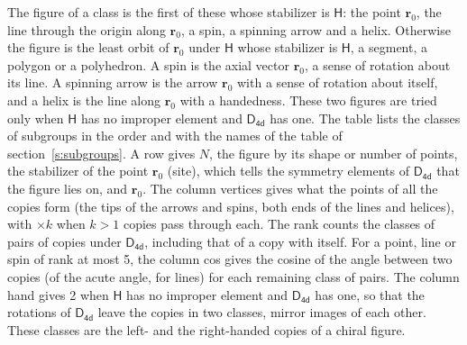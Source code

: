 \documentclass[10pt,a4paper]{article}
\numberwithin{equation}{section}
\newcommand{\grp}[1]{\mathsf{#1}}
\newcommand{\pointr}{\mathbf{r}}
\begin{document}
\leavevmode\label{n:head.figure}The figure of a class is the first of these whose stabilizer is $\grp{H}$: the point $\pointr_0$, the line through the origin along $\pointr_0$, a spin, a spinning arrow and a helix. Otherwise the figure is the least orbit of $\pointr_0$ under $\grp{H}$ whose stabilizer is $\grp{H}$, a segment, a polygon or a polyhedron. A spin is the axial vector $\pointr_0$, a sense of rotation about its line. A spinning arrow is the arrow $\pointr_0$ with a sense of rotation about itself, and a helix is the line along $\pointr_0$ with a handedness. These two figures are tried only when $\grp{H}$ has no improper element and $\grp{D_{4d}}$ has one. The table lists the classes of subgroups in the order and with the names of the table of section~\ref{s:subgroups}. \label{n:head.site}A row gives $N$, the figure by its shape or number of points, the stabilizer of the point $\pointr_0$ (site), which tells the symmetry elements of $\grp{D_{4d}}$ that the figure lies on, and $\pointr_0$. \label{n:head.vertices}The column vertices gives what the points of all the copies form (the tips of the arrows and spins, both ends of the lines and helices), with ${\times}k$ when $k > 1$ copies pass through each. \label{n:head.rank}The rank counts the classes of pairs of copies under $\grp{D_{4d}}$, including that of a copy with itself. \label{n:head.cos}For a point, line or spin of rank at most 5, the column cos gives the cosine of the angle between two copies (of the acute angle, for lines) for each remaining class of pairs. \label{n:head.hand}The column hand gives 2 when $\grp{H}$ has no improper element and $\grp{D_{4d}}$ has one, so that the rotations of $\grp{D_{4d}}$ leave the copies in two classes, mirror images of each other. These classes are the left- and the right-handed copies of a chiral figure.
\end{document}
